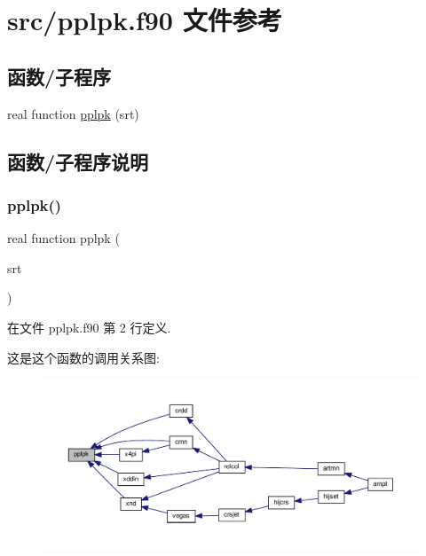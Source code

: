 \hypertarget{pplpk_8f90}{}\section{src/pplpk.f90 文件参考}
\label{pplpk_8f90}
\subsection*{函数/子程序}
\begin{DoxyCompactItemize}
\item 
real function \mbox{\hyperlink{pplpk_8f90_a9eabd1a7deb4249e01dd67ba0256c392}{pplpk}} (srt)
\end{DoxyCompactItemize}


\subsection{函数/子程序说明}
\mbox{\label{pplpk_8f90_a9eabd1a7deb4249e01dd67ba0256c392}} 
\subsubsection{\texorpdfstring{pplpk()}{pplpk()}}
{\footnotesize\ttfamily real function pplpk (\begin{DoxyParamCaption}\item[{}]{srt }\end{DoxyParamCaption})}



在文件 pplpk.\+f90 第 2 行定义.

这是这个函数的调用关系图\+:
\nopagebreak
\begin{figure}[H]
\begin{center}
\leavevmode
\includegraphics[width=350pt]{pplpk_8f90_a9eabd1a7deb4249e01dd67ba0256c392_icgraph}
\end{center}
\end{figure}

